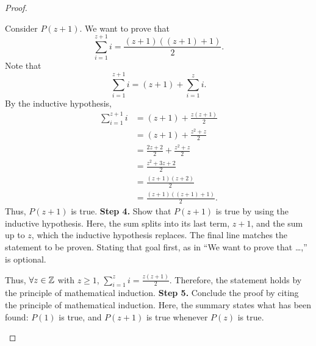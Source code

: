 \begin{proof}
{    \begin{annotatedpanel}{
        Consider $P(z + 1)$. %
        We want to prove that
        \[
            \sum_{i=1}^{z+1} i = \frac{(z + 1)((z + 1) + 1)}{2}.
        \]
        Note that
        \[
            \sum_{i=1}^{z+1} i = (z + 1) + \sum_{i=1}^{z} i.
        \]
        By the inductive hypothesis,
        \begin{align*}
            \sum_{i=1}^{z+1} i &= (z + 1) + \frac{z(z + 1)}{2}\\
                &= (z + 1) + \frac{z^2 + z}{2}\\
                &= \frac{2z + 2}{2} + \frac{z^2 + z}{2}\\
                &= \frac{z^2 + 3z + 2}{2}\\
                &= \frac{(z + 1)(z + 2)}{2}\\
                &= \frac{(z + 1)((z + 1) + 1)}{2}.
        \end{align*}
        Thus, $P(z + 1)$ is true.
    }{
        \textbf{Step 4.} Show that $P(z + 1)$ is true by using the %
        inductive hypothesis. %
        Here, the sum splits into its last term, $z + 1$, %
        and the sum up to $z$, which the inductive hypothesis replaces. %
        The final line matches the statement to be proven. %
        Stating that goal first, as in ``We want to prove that \dots,'' %
        is optional.
    }
    \end{annotatedpanel}

    \begin{annotatedpanel}[Conclusion.]{
        Thus, $\forall z \in \mathbb{Z}$ with $z \ge 1$, %
        $\displaystyle\sum_{i=1}^{z} i = \frac{z(z + 1)}{2}$. %
        Therefore, the statement holds by the principle of mathematical %
        induction. \qedhere
    }{
        \textbf{Step 5.} Conclude the proof by citing the principle %
        of mathematical induction. %
        Here, the summary states what has been found: %
        $P(1)$ is true, and $P(z + 1)$ is true whenever $P(z)$ is true.
    }
    \end{annotatedpanel}
}
\end{proof}